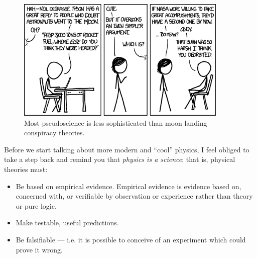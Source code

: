 \documentclass[a4paper]{amsbook}
\theoremstyle{definition}
\numberwithin{exercise}{chapter}
\numberwithin{exercise}{chapter}
\begin{document}
\begin{figure}
  \centering
  \includegraphics[width=0.9\textwidth]{moon_landing}
  \caption{Most pseudoscience is less sophisticated than moon landing conspiracy theories.}\label{fig:moon_landing}
\end{figure}


Before we start talking about more modern and ``cool'' physics, I feel obliged to take a step
back and remind you that \emph{physics is a science}; that is, physical theories must:
\begin{itemize}
  \item Be based on empirical evidence. Empirical evidence is evidence based on, concerned with, or verifiable by observation or
        experience rather than theory or pure logic.
  \item Make testable, useful predictions.
  \item Be falsifiable --- i.e. it is possible to conceive of an experiment which could prove it wrong.
\end{itemize}
\end{document}
